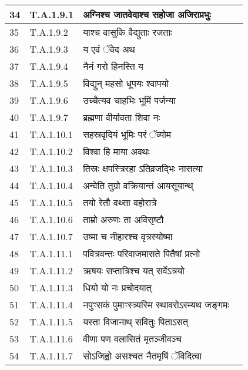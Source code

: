 \documentclass[17pt]{extarticle}
\begin{document}
\begin{longtable}{||p{0.4in}||p{0.9in}||p{4.0in}||p{0.9in}||}
        \hline
            34 & T.A.1.9.1 & अग्निश्च जातवेदाश्च सहोजा अजिराप्रभुः &      \\
        \hline
            35 & T.A.1.9.2 & याश्च वासुकि वैद्युताः रजताः &      \\
        \hline
            36 & T.A.1.9.3 & य एवं ॅवेद अथ &      \\
        \hline
            37 & T.A.1.9.4 & नैनं गरो हिनस्ति य &      \\
        \hline
            38 & T.A.1.9.5 & विद्युन् महसो धूपयः श्वापयो &      \\
        \hline
            39 & T.A.1.9.6 & उच्चैत्यव चाहभिः भूमिं पर्जन्या &      \\
        \hline
            40 & T.A.1.9.7 & ब्रह्मणा वीर्यावता शिवा नः &      \\
        \hline
            41 & T.A.1.10.1 & सहस्रवृदियं भूमिः परं ॅव्योम &      \\
        \hline
            42 & T.A.1.10.2 & विश्वा हि माया अवथः &      \\
        \hline
            43 & T.A.1.10.3 & तिस्रः क्षपस्त्रिरहा ऽतिव्रजद्भिः नासत्या &      \\
        \hline
            44 & T.A.1.10.4 & अन्वेति तुग्रो वक्रियान्तं आयसूयान्थ् &      \\
        \hline
            45 & T.A.1.10.5 & तयो रेतौ वथ्सा वहोरात्रे &      \\
        \hline
            46 & T.A.1.10.6 & ताम्रो अरुणः ता अविसृष्टौ &      \\
        \hline
            47 & T.A.1.10.7 & उष्मा च नीहारश्च वृत्रस्योष्मा &      \\
        \hline
            48 & T.A.1.11.1 & पवित्रवन्तः परिवाजमासते पितैषां प्रत्नो &      \\
        \hline
            49 & T.A.1.11.2 & ऋषयः सप्तात्रिश्च यत् सर्वेऽत्रयो &      \\
        \hline
            50 & T.A.1.11.3 & धियो यो नः प्रचोदयात् &      \\
        \hline
            51 & T.A.1.11.4 & नपुꣳसकं पुमाꣳस्त्र्यस्मि स्थावरोऽस्म्यथ जङ्गमः &      \\
        \hline
            52 & T.A.1.11.5 & यस्ता विजानाथ् सवितुः पिताऽसत् &      \\
        \hline
            53 & T.A.1.11.6 & वीणा पण वलासितं मृतञ्जीवञ्च &      \\
        \hline
            54 & T.A.1.11.7 & सोऽजिह्वो असश्चत नैतमृषिं ॅविदित्वा &      \\

\end{longtable}
\end{document}
